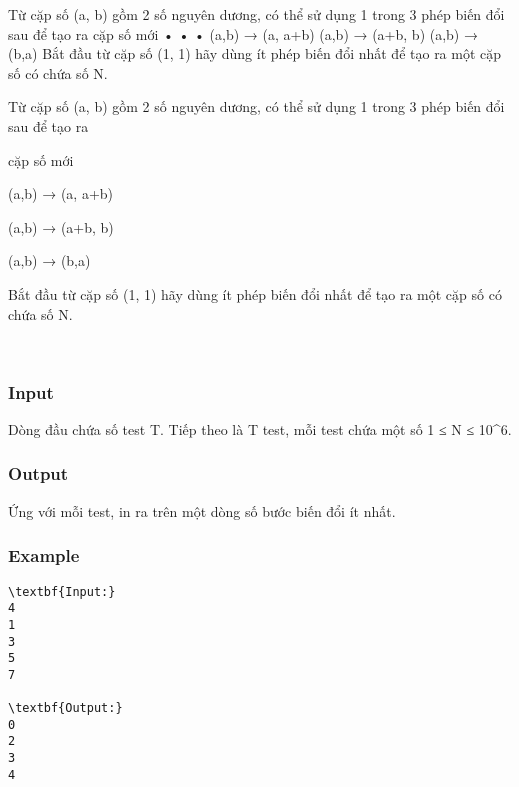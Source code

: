 

Từ cặp số (a, b) gồm 2 số nguyên dương, có thể sử dụng 1 trong 3 phép biến đổi sau để tạo ra cặp số mới • • • (a,b) → (a, a+b) (a,b) → (a+b, b) (a,b) → (b,a) Bắt đầu từ cặp số (1, 1) hãy dùng ít phép biến đổi nhất để tạo ra một cặp số có chứa số N.

Từ cặp số (a, b) gồm 2 số nguyên dương, có thể sử dụng 1 trong 3 phép biến đổi sau để tạo ra

cặp số mới

(a,b) → (a, a+b)

(a,b) → (a+b, b)

(a,b) → (b,a)

Bắt đầu từ cặp số (1, 1) hãy dùng ít phép biến đổi nhất để tạo ra một cặp số có chứa số N.

 

\subsubsection{Input}

Dòng đầu chứa số test T. Tiếp theo là T test, mỗi test chứa một số 1 ≤ N ≤ 10^6.

\subsubsection{Output}

Ứng với mỗi test, in ra trên một dòng số bước biến đổi ít nhất.

\subsubsection{Example}
\begin{verbatim}
\textbf{Input:}
4
1
3
5
7

\textbf{Output:}
0
2
3
4\end{verbatim}
